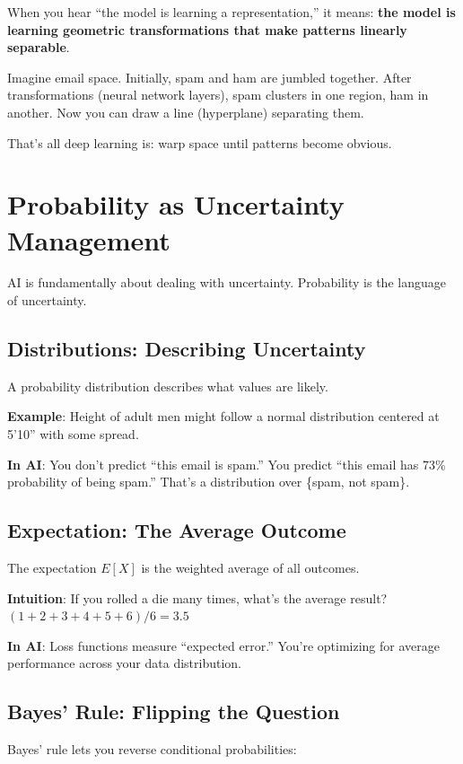 \documentclass[11pt,oneside]{book}
\begin{document}
When you hear ``the model is learning a representation,'' it means: \textbf{the model is learning geometric transformations that make patterns linearly separable}.

Imagine email space. Initially, spam and ham are jumbled together. After transformations (neural network layers), spam clusters in one region, ham in another. Now you can draw a line (hyperplane) separating them.

That's all deep learning is: warp space until patterns become obvious.

\section{Probability as Uncertainty Management}

AI is fundamentally about dealing with uncertainty. Probability is the language of uncertainty.

\subsection{Distributions: Describing Uncertainty}

A probability distribution describes what values are likely.

\textbf{Example}: Height of adult men might follow a normal distribution centered at 5'10'' with some spread.

\textbf{In AI}: You don't predict ``this email is spam.'' You predict ``this email has 73\% probability of being spam.'' That's a distribution over \{spam, not spam\}.

\subsection{Expectation: The Average Outcome}

The expectation $E[X]$ is the weighted average of all outcomes.

\textbf{Intuition}: If you rolled a die many times, what's the average result? $(1+2+3+4+5+6)/6 = 3.5$

\textbf{In AI}: Loss functions measure ``expected error.'' You're optimizing for average performance across your data distribution.

\subsection{Bayes' Rule: Flipping the Question}

Bayes' rule lets you reverse conditional probabilities:
\end{document}
